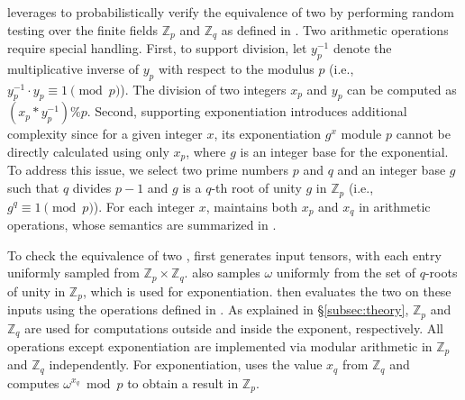 \sys leverages  to probabilistically verify the equivalence of two \graphs by performing random testing over the finite fields $\mathbb{Z}_p$ and $\mathbb{Z}_q$ as defined in .
%
%
%
%
%
Two arithmetic operations require special handling.
%
First, to support division, let $y_p^{-1}$ denote the multiplicative inverse of $y_p$ with respect to the modulus $p$
(i.e., $y_p^{-1} \cdot y_p \equiv 1 \pmod{p}$).
%
The division of two integers $x_p$ and $y_p$ can be computed as $(x_p * y_p^{-1}) \% p$.
%
Second, supporting exponentiation introduces additional complexity since for a given integer $x$, its exponentiation $g^x$ module $p$ cannot be directly calculated using only $x_p$, where $g$ is an integer base for the exponential.
%
To address this issue, we select two prime numbers $p$ and $q$ and an integer base $g$ such that $q$ divides $p-1$ and $g$ is a $q$-th root of unity $g$ in $\mathbb{Z}_p$ (i.e., $g^q \equiv 1 \pmod{p}$). For each integer $x$, \sys maintains both $x_p$ and $x_q$ in arithmetic operations, whose semantics are summarized in .
%

\fi
To check the equivalence of two \graphs, \sys first generates input tensors, with each entry uniformly sampled from $\mathbb{Z}_p \times \mathbb{Z}_q$.
\sys also samples $\omega$ uniformly from the set of $q$-roots of unity in $\mathbb{Z}_p$, which is used for exponentiation.
\sys then evaluates the two \graphs on these inputs using the operations defined in .
As explained in \S\ref{subsec:theory}, $\mathbb{Z}_p$ and $\mathbb{Z}_q$ are used for computations outside and inside the exponent, respectively.
All operations except exponentiation are implemented via modular arithmetic in $\mathbb{Z}_p$ and $\mathbb{Z}_q$ independently.
For exponentiation, \sys uses the value $x_q$ from $\mathbb{Z}_q$ and computes $\omega^{x_q} \bmod p$ to obtain a result in $\mathbb{Z}_p$.

